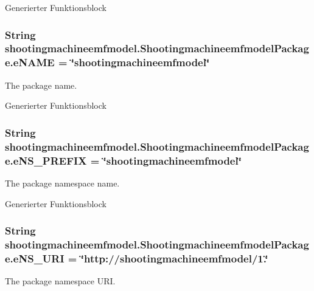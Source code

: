 Generierter Funktionsblock \hypertarget{interfaceshootingmachineemfmodel_1_1_shootingmachineemfmodel_package_a4478551bf090436803a93ef9544f0f6a}{
\subsubsection[{e\-N\-A\-M\-E}]{\setlength{\rightskip}{0pt plus 5cm}String shootingmachineemfmodel.\-Shootingmachineemfmodel\-Package.\-e\-N\-A\-M\-E = \char`\"{}shootingmachineemfmodel\char`\"{}}}\label{interfaceshootingmachineemfmodel_1_1_shootingmachineemfmodel_package_a4478551bf090436803a93ef9544f0f6a}
The package name.

Generierter Funktionsblock \hypertarget{interfaceshootingmachineemfmodel_1_1_shootingmachineemfmodel_package_a60c635ac3f47cc3d4b2ea76e4a09c980}{
\subsubsection[{e\-N\-S\-\_\-\-P\-R\-E\-F\-I\-X}]{\setlength{\rightskip}{0pt plus 5cm}String shootingmachineemfmodel.\-Shootingmachineemfmodel\-Package.\-e\-N\-S\-\_\-\-P\-R\-E\-F\-I\-X = \char`\"{}shootingmachineemfmodel\char`\"{}}}\label{interfaceshootingmachineemfmodel_1_1_shootingmachineemfmodel_package_a60c635ac3f47cc3d4b2ea76e4a09c980}
The package namespace name.

Generierter Funktionsblock \hypertarget{interfaceshootingmachineemfmodel_1_1_shootingmachineemfmodel_package_a82d88995e1a38d22711a9c8a17b873b8}{
\subsubsection[{e\-N\-S\-\_\-\-U\-R\-I}]{\setlength{\rightskip}{0pt plus 5cm}String shootingmachineemfmodel.\-Shootingmachineemfmodel\-Package.\-e\-N\-S\-\_\-\-U\-R\-I = \char`\"{}http\-://shootingmachineemfmodel/1.\char`\"{}}}\label{interfaceshootingmachineemfmodel_1_1_shootingmachineemfmodel_package_a82d88995e1a38d22711a9c8a17b873b8}
The package namespace U\-R\-I.

